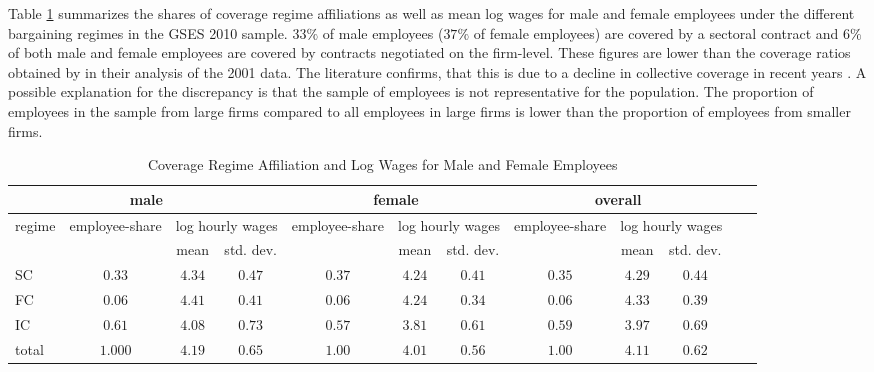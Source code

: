 Table \ref{Coverage Regime} summarizes the shares of coverage regime affiliations as well as mean log wages for male and female employees under the different bargaining regimes in the GSES 2010 sample. $33\%$ of male employees ($37\%$ of female employees) are covered by a sectoral contract and $6\%$ of both male and female employees are covered by contracts negotiated on the firm-level. These figures are lower than the coverage ratios obtained by \cite{Fitzenberger&Kohn&Lembcke:13} in their analysis of the 2001 data. The literature confirms, that this is due to a decline in collective coverage in recent years \citep{Addison&Bryson&Teixeira&Pahnke6Bellmann:13}. A possible explanation for the discrepancy is that the sample of employees is not representative for the population. The proportion of employees in the sample from large firms compared to all employees in large firms is lower than the proportion of employees from smaller firms.
\begin{table}[h]
\scriptsize
\centering
\caption{Coverage Regime Affiliation and Log Wages for Male and Female Employees}
\label{Coverage Regime}
\begin{tabular}{l|ccccccccccc}
\multicolumn{4}{c}{male}                                                                               & \multicolumn{3}{c}{female}             &\multicolumn{3}{c}{overall}                                                              \\
\hline
\multirow{2}{*}{regime} & \multirow{2}{*}{employee-share} & \multicolumn{2}{l}{log hourly wages}    & \multirow{2}{*}{employee-share} & \multicolumn{2}{l}{log hourly wages}    & \multirow{2}{*}{employee-share} & \multicolumn{2}{l}{log hourly wages}\\
                        &                       & mean    & std. dev.   &                                         & mean           & std. dev.         &                   & mean           & std. dev.          \\
\hline
SC                      &     $0.33$     &   $4.34$     &   $0.47$   &                       $0.37$           &   $4.24$     &   $0.41$                             &$0.35$&$4.29$& $0.44$\\
FC                      &     $0.06$     &   $4.41$     &   $0.41$   &                       $0.06$           &   $4.24$     &   $0.34$                             &$0.06$& $4.33$& $0.39$\\
IC                      &     $0.61$     &   $4.08$     &   $0.73$   &                       $0.57$           &   $3.81$     &   $0.61$                             &$0.59$& $3.97$& $0.69$\\
total                   &     $1.000$     &   $4.19$     &   $0.65$   &                       $1.00$           &   $4.01$     &   $0.56$                            &$1.00$& $4.11$& $0.62$\\
\hline
\end{tabular}
\end{table}
